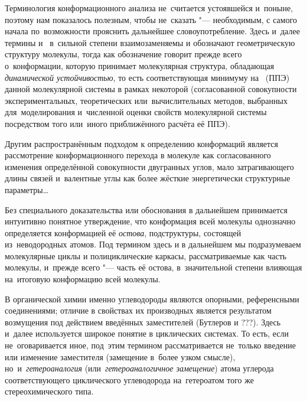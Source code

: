 Терминология конформационного анализа не~считается устоявшейся и~поныне, поэтому нам показалось полезным, чтобы не~сказать "--- необходимым, с самого начала по~возможности прояснить дальнейшее словоупотребление. Здесь и~далее термины  и~ в~сильной степени взаимозаменяемы и обозначают геометрическую структуру молекулы, тогда как обозначение  говорит прежде всего о~конформации, которую принимает молекулярная структура, обладающая \emph{динамической устойчивостью}, то есть соответствующая минимуму на~ (ППЭ) данной молекулярной системы в рамках некоторой  (согласованной совокупности экспериментальных, теоретических или~вычислительных методов, выбранных для~моделирования и~численной оценки свойств молекулярной системы посредством того или~иного приближённого расчёта её ППЭ).

Другим распространённым подходом к определению конформаций является рассмотрение конформационного перехода в молекуле как согласованного изменения определённой совокупности двугранных углов, мало затрагивающего длины связей и~валентные углы как более жёсткие энергетически структурные параметры\dots

Без специального доказательства или обоснования в дальнейшем принимается интуитивно понятное утверждение, что конформация всей молекулы однозначно определяется конформацией её \emph{остова}, подструктуры, состоящей из~неводородных атомов.
Под термином  здесь и в дальнейшем мы подразумеваем молекулярные циклы и полициклические каркасы, рассматриваемые как часть молекулы, и~прежде всего "--- часть её остова, в~значительной степени влияющая на~итоговую конформацию всей молекулы.

В органической химии именно углеводороды являются опорными, референсными соединениями; отличие в свойствах их производных является результатом возмущения под действием введённых заместителей (Бутлеров и ???). Здесь и~далее используется широкое понятие  в циклических системах. То есть, если не~оговаривается иное, под~этим термином рассматривается не~только введение или изменение заместителя (замещение в~более узком смысле), но~и~\emph{гетероаналогия} (или~\emph{гетероаналогичное замещение}) атома углерода соответствующего циклического углеводорода на~гетероатом того же стереохимического типа.

